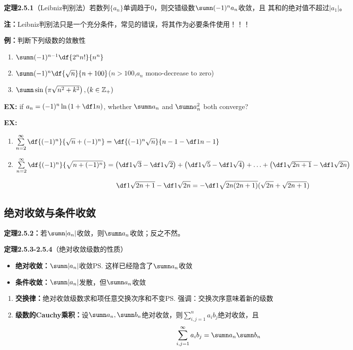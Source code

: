 {\bf 定理2.5.1}（Leibniz判别法）若数列$\{a_n\}$单调趋于$0$，则交错级数$\sumn (-1)^na_n$收敛，且
其和的绝对值不超过$|a_1|$。

{\bf 注：}Leibniz判别法只是一个充分条件，常见的错误，将其作为必要条件使用！！！

{\bf 例：}判断下列级数的敛散性
\begin{enumerate} [(1)]
  \setlength{\itemindent}{1cm}
  \item $\sumn(-1)^{n-1}\df{2^nn!}{n^n}$ 
  \item $\sumn(-1)^n\df{\sqrt{n}}{n+100}$\hfill{($n>100$,$a_n$ mono-decrease to
  zero)}
  \item $\sumn\sin\left(\pi\sqrt{n^2+k^2}\right),(k\in\mathbb{Z}_+)$
\end{enumerate}

{\bf EX:} if $a_n=(-1)^n\ln\left(1+\df1n\right)$, whether 
$\sumn a_n$ and $\sumn a^2_n$ both converge?

{\bf EX:}
\begin{enumerate}[(1)]
  \setlength{\itemindent}{1cm}
  \item $\sum\limits_{n=2}^{\infty}\df{(-1)^n}{\sqrt n+(-1)^n}
  =\df{(-1)^n\sqrt n}{n-1-\df1{n-1}}$
  \item $\sum\limits_{n=2}^{\infty}\df{(-1)^n}{\sqrt{n+(-1)^n}}
  =\left(\df1{\sqrt 3}-\df1{\sqrt 2}\right)+\left(\df1{\sqrt 5}-\df1{\sqrt
  4}\right)+\ldots+\left(\df1{\sqrt{2n+1}}-\df1{\sqrt{2n}}\right)$
\end{enumerate}

$$\df1{\sqrt{2n+1}}-\df1{\sqrt{2n}}=-\df1{\sqrt{2n(2n+1)}
(\sqrt{2n}+\sqrt{2n+1})}$$

\subsection{绝对收敛与条件收敛}

{\bf 定理2.5.2：}若$\sumn |a_n|$收敛，则$\sumn a_n$收敛；反之不然。

{\bf 定理2.5.3-2.5.4}（绝对收敛级数的性质）

\begin{itemize}
  \setlength{\itemindent}{1cm}
  \item {\bf 绝对收敛：}$\sumn |a_n|$收敛\ps{这样已经隐含了$\sumn a_n$收敛}
  \item {\bf 条件收敛：}$\sumn |a_n|$发散，但$\sumn a_n$收敛
\end{itemize}

\begin{enumerate}[(1)]
  \setlength{\itemindent}{1cm}
  \item {\bf 交换律：}绝对收敛级数求和项任意交换次序和不变\ps{强调：交换次序意味着新的级数}
  \item {\bf 级数的Cauchy乘积：}设$\sumn a_n,\sumn
	  b_n$绝对收敛，则$\sum\limits_{i,j=1}^na_ib_j$绝对收敛，且
	  $$\sum\limits_{i,j=1}^{\infty}a_ib_j=\sumn a_n\sumn b_n$$
\end{enumerate}

